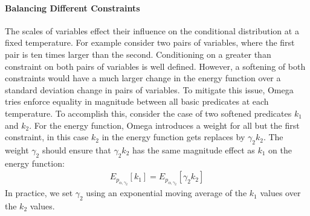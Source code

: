\paragraph{Balancing Different Constraints}
The scales of variables effect their influence on
the conditional distribution at a fixed temperature.
For example consider two pairs of variables, where
the first pair is ten times larger than the second.
Conditioning on a greater than constraint on both
pairs of variables is well defined. However,
a softening of both constraints would have 
a much larger change in the energy function over
a standard deviation change in pairs of variables.
To mitigate this issue, Omega tries enforce equality
in magnitude between all basic predicates at each temperature.
To accomplish this, consider the case of two 
softened predicates $k_1$ and $k_2$. For the
energy function, Omega introduces a weight
for all but the first constraint, in this
case $k_2$ in the energy function gets replaces
by $\gamma_2 k_2$. The weight $\gamma_2$ should
ensure that $\gamma_2 k_2$ has the same
magnitude effect as $k_1$ on the energy
function:
\begin{align*}
E_{p_{\alpha, \gamma_2}}[k_1] = E_{p_{\alpha, \gamma_2}}[\gamma_2 k_2] 
\end{align*}
In practice, we set $\gamma_2$ using an exponential moving
average of the $k_1$ values over the $k_2$ values.



